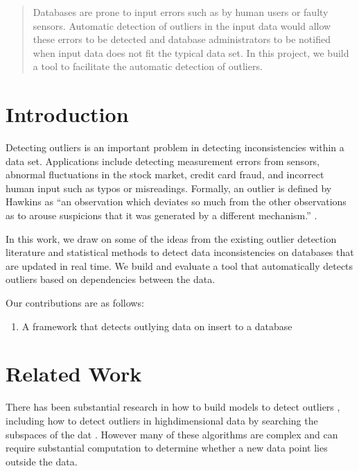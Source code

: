\documentclass{vldb}
\begin{document}
\maketitle

\begin{abstract}
Databases are prone to input errors such as by human users or faulty sensors.
Automatic detection of outliers in the input data would allow these errors to be detected and database administrators to be notified when input data does not fit the typical data set.
In this project, we build a tool to facilitate the automatic detection of outliers.
\end{abstract}




\section{Introduction}
Detecting outliers is an important problem in detecting inconsistencies within a data set.
Applications include detecting measurement errors from sensors, abnormal fluctuations in the stock market, credit card fraud, and incorrect human input such as typos or misreadings.
Formally, an outlier is defined by Hawkins as “an observation which deviates so much from the other observations as to arouse suspicions that it was generated by a different mechanism.” \cite{Hawkins1980}.

In this work, we draw on some of the ideas from the existing outlier detection literature and statistical methods to detect data inconsistencies on databases that are updated in real time.
We build and evaluate a tool that automatically detects outliers based on dependencies between the data.

Our contributions are as follows:
\begin{enumerate}
\item A framework that detects outlying data on insert to a database
\end{enumerate}

\section{Related Work}

There has been substantial research in how to build models to detect outliers \cite{Aggarwal2013}, including how to detect outliers in high­dimensional data by searching the subspaces of the dat \cite{Zhang2004}\cite{Kriegel2009}.
However many of these algorithms are complex and can require substantial computation to determine whether a new data point lies outside the data.
\end{document}
